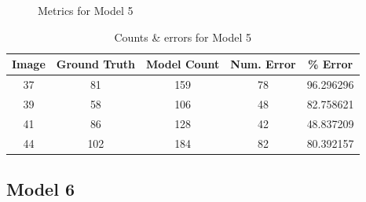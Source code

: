 \begin{appendices}
\begin{figure}[h!]
\caption{Metrics for Model 5}
\end{figure}

\begin{table}[h!]
\centering
\begin{tabular}{||c c c c c||} 
\hline
Image &  Ground Truth &  Model Count &  Num. Error &    \% Error \\
\hline\hline
37 &            81 &          159 &          78 &  96.296296 \\
39 &            58 &          106 &          48 &  82.758621 \\
41 &            86 &          128 &          42 &  48.837209 \\
44 &           102 &          184 &          82 &  80.392157 \\
\hline
\end{tabular}
\caption{Counts \& errors for Model 5}
\label{count_5}
\end{table}

\subsection{Model 6}


\end{appendices}
